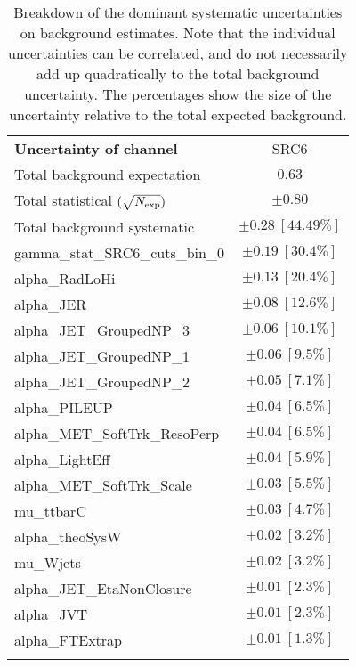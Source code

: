 
\begin{table}
\begin{center}
\setlength{\tabcolsep}{0.0pc}
\begin{tabular*}{\textwidth}{@{\extracolsep{\fill}}lc}
\noalign{\smallskip}\hline\noalign{\smallskip}
{\bf Uncertainty of channel}                                    & SRC6            \\
\noalign{\smallskip}\hline\noalign{\smallskip}
Total background expectation             &  $0.63$       \\
\noalign{\smallskip}\hline\noalign{\smallskip}
Total statistical $(\sqrt{N_{\rm exp}})$              & $\pm 0.80$       \\
Total background systematic               & $\pm 0.28\ [44.49\%] $             \\
\noalign{\smallskip}\hline\noalign{\smallskip}
\noalign{\smallskip}\hline\noalign{\smallskip}
gamma\_stat\_SRC6\_cuts\_bin\_0         & $\pm 0.19\ [30.4\%] $       \\
alpha\_RadLoHi         & $\pm 0.13\ [20.4\%] $       \\
alpha\_JER         & $\pm 0.08\ [12.6\%] $       \\
alpha\_JET\_GroupedNP\_3         & $\pm 0.06\ [10.1\%] $       \\
alpha\_JET\_GroupedNP\_1         & $\pm 0.06\ [9.5\%] $       \\
alpha\_JET\_GroupedNP\_2         & $\pm 0.05\ [7.1\%] $       \\
alpha\_PILEUP         & $\pm 0.04\ [6.5\%] $       \\
alpha\_MET\_SoftTrk\_ResoPerp         & $\pm 0.04\ [6.5\%] $       \\
alpha\_LightEff         & $\pm 0.04\ [5.9\%] $       \\
alpha\_MET\_SoftTrk\_Scale         & $\pm 0.03\ [5.5\%] $       \\
mu\_ttbarC         & $\pm 0.03\ [4.7\%] $       \\
alpha\_theoSysW         & $\pm 0.02\ [3.2\%] $       \\
mu\_Wjets         & $\pm 0.02\ [3.2\%] $       \\
alpha\_JET\_EtaNonClosure         & $\pm 0.01\ [2.3\%] $       \\
alpha\_JVT         & $\pm 0.01\ [2.3\%] $       \\
alpha\_FTExtrap         & $\pm 0.01\ [1.3\%] $       \\
\noalign{\smallskip}\hline\noalign{\smallskip}
\end{tabular*}
\end{center}
\caption[Breakdown of uncertainty on background estimates]{
Breakdown of the dominant systematic uncertainties on background estimates.
Note that the individual uncertainties can be correlated, and do not necessarily add up quadratically to 
the total background uncertainty. The percentages show the size of the uncertainty relative to the total expected background.
\label{table.results.bkgestimate.uncertainties.SRC6}}
\end{table}
%